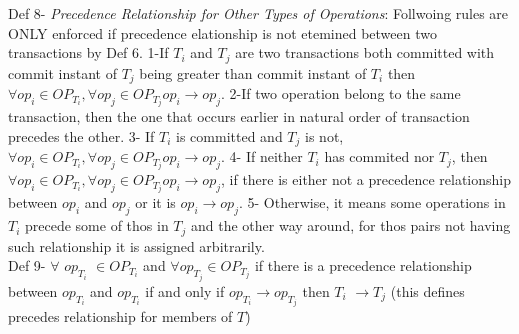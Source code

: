 \documentclass[a4paper, 11pt]{article}
\begin{document}
Def 8- \emph{Precedence Relationship for Other Types of Operations}:  Follwoing rules are ONLY enforced if precedence elationship is not etemined between two transactions by Def 6. 1-If $T_i$ and $T_j$ are two transactions both committed with commit instant of $T_j$ being greater than commit instant of $T_i$ then $\forall op_i \in OP_{T_i}, \forall op_j \in OP_{T_j} op_i \rightarrow op_j$. 2-If two operation belong to the same transaction, then the one that occurs earlier in natural order of transaction precedes the other. 3- If $T_i$ is committed and $T_j$ is not, $\forall op_i \in OP_{T_i}, \forall op_j \in OP_{T_j} op_i \rightarrow op_j$. 4- If neither $T_i$ has commited nor $T_j$, then  $\forall op_i \in OP_{T_i}, \forall op_j \in OP_{T_j} op_i \rightarrow op_j$, if there is either not a precedence relationship between $op_i$ and $op_j$ or it is $op_i \rightarrow op_j$. 5- Otherwise, it means some operations in $T_i$ precede some of thos in $T_j$ and the other way around, for thos pairs not having such relationship it is assigned arbitrarily.\\

Def 9- $\forall$ $op_{T_i}$ $\in OP_{T_i}$ and $\forall op_{T_j}\in OP_{T_j}$ if there is a precedence relationship between $op_{T_i}$ and $op_{T_i}$ if and only if $op_{T_i} \rightarrow op_{T_j}$ then $T_i$ $\rightarrow T_j$ \hspace{8mm} (this defines precedes relationship for members of $T$) \\



\end{document}
